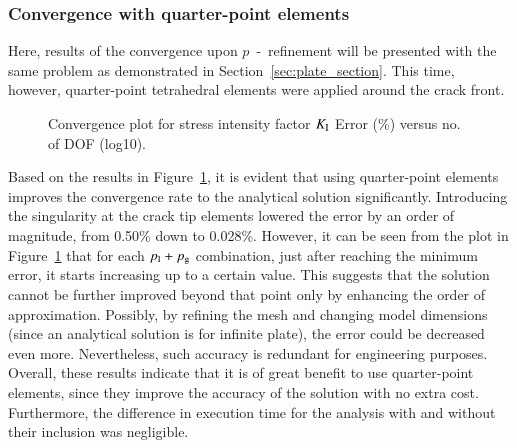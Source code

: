 \documentclass[11pt]{acmeArticle}
\numberwithin{equation}{section}
\begin{document}
\subsubsection{Convergence with quarter-point elements}
\label{sec:quarter_point_results}
Here, results of the convergence upon $p$~-~refinement will be presented with the same problem as demonstrated in Section~\ref{sec:plate_section}. 
This time, however, quarter-point tetrahedral elements were applied around the crack front.
\begin{figure}[h!]
	\centering
	
	
	\caption{Convergence plot for stress intensity factor $K_{\rm I}$ Error (\%) versus no. of DOF (log10).}
	\label{fig:plate_conv_singularity}
\end{figure}
Based on the results in Figure~\ref{fig:plate_conv_singularity}, it is evident that using quarter-point elements improves the convergence rate to the analytical solution significantly. 
Introducing the singularity at the crack tip elements lowered the error by an order of magnitude, from 0.50\% down to 0.028\%. 
However, it can be seen from the plot in Figure~\ref{fig:plate_conv_singularity} that for each $p_{\rm l} + p_{\rm g}$ combination, just after reaching the minimum error, it starts increasing up to a certain value. 
This suggests that the solution cannot be further improved beyond that point only by enhancing the order of approximation. 
Possibly, by refining the mesh and changing model dimensions (since an analytical solution is for infinite plate), the error could be decreased even more. 
Nevertheless, such accuracy is redundant for engineering purposes. \\
Overall, these results indicate that it is of great benefit to use quarter-point elements, since they improve the accuracy of the solution with no extra cost.
Furthermore, the difference in execution time for the analysis with and without their inclusion was negligible. 
\end{document}
